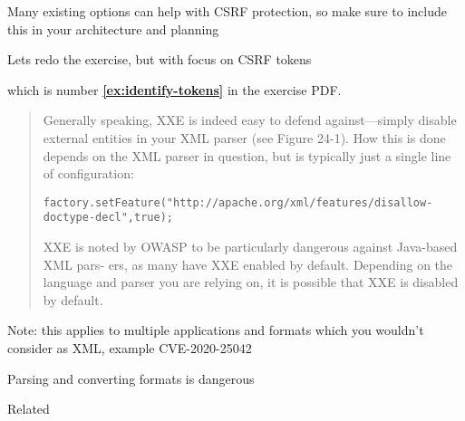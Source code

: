 \documentclass[Screen16to9,17pt]{foils}
\begin{document}
\begin{list2}
\item Many existing options can help with CSRF protection, so make sure to include this in your architecture and planning
\end{list2}


\begin{center}
Lets redo the exercise, but with focus on CSRF tokens

{\bf\hlkbig {}}

which is number {\bf \ref{ex:identify-tokens}} in the exercise PDF.
\end{center}






\begin{quote}\small
Generally speaking, XXE is indeed easy to defend against—simply disable external
entities in your XML parser (see Figure 24-1). How this is done depends on the XML
parser in question, but is typically just a single line of configuration:
\begin{alltt}
factory.setFeature("http://apache.org/xml/features/disallow-doctype-decl", true);
\end{alltt}
XXE is noted by OWASP to be particularly dangerous against Java-based XML pars‐
ers, as many have XXE enabled by default. Depending on the language and parser
you are relying on, it is possible that XXE is disabled by default.
\end{quote}

\begin{list2}
\item Note: this applies to multiple applications and formats which you wouldn't consider as XML, example CVE-2020-25042\\
\item Parsing and converting formats is dangerous
\item {}
\item {}
\item Related 
\end{list2}
\end{document}
